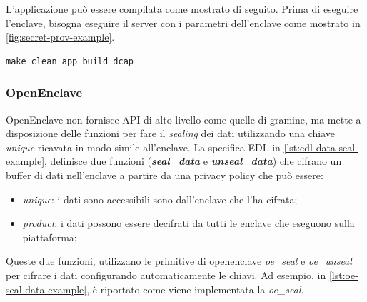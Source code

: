 \documentclass{article}
\begin{document}


L'applicazione può essere compilata come mostrato di seguito. Prima di eseguire l'enclave, bisogna eseguire il server con i parametri dell'enclave come mostrato in \cref{fig:secret-prov-example}.
\begin{verbatim}
make clean app build dcap 
\end{verbatim}

\subsubsection{OpenEnclave}
OpenEnclave non fornisce API di alto livello come quelle di gramine, ma mette a disposizione delle funzioni per fare il \textit{sealing} dei dati utilizzando una chiave \textit{unique} ricavata in modo simile all'enclave. La specifica EDL in \cref{lst:edl-data-seal-example}, definisce due funzioni (\textbf{\textit{seal\_data}} e \textbf{\textit{unseal\_data}}) che cifrano un buffer di dati nell'enclave a partire da una privacy policy che può essere:
\begin{itemize}
  \item \textit{unique}: i dati sono accessibili sono dall'enclave che l'ha cifrata;
  \item \textit{product}: i dati possono essere decifrati da tutti le enclave che eseguono sulla piattaforma;
\end{itemize}


Queste due funzioni, utilizzano le primitive di openenclave \textit{oe\_seal} e \textit{oe\_unseal} per cifrare i dati configurando automaticamente le chiavi. Ad esempio, in \cref{lst:oe-seal-data-example}, è riportato come viene implementata la \textit{oe\_seal}.
\end{document}
